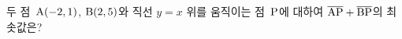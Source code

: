 두 점~$\mathrm{A}(-2{,}\mkern3mu\mathopen{}1)$, $\mathrm{B}(2{,}\mkern3mu\mathopen{}5)$와 직선 $y=x$ 위를 움직이는 점~$\mathrm{P}$에 대하여 $\overline{\mathrm{AP}}+\overline{\mathrm{BP}}$의 최솟값은?
